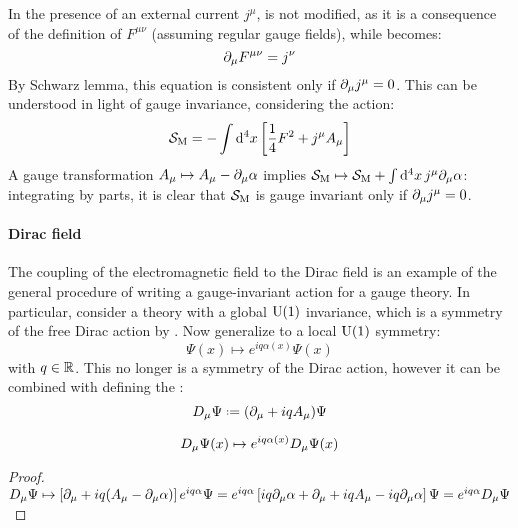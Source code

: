 In the presence of an external current $ j^\mu $,  is not modified, as it is a consequence of the definition of $ F^{\mu \nu} $ (assuming regular gauge fields), while  becomes:
\begin{equation}
  \partial_\mu F^{\mu \nu} = j^\nu
  \label{eq:maxw-3}
\end{equation}
By Schwarz lemma, this equation is consistent only if $ \partial_\mu j^\mu = 0 $. This can be understood in light of gauge invariance, considering the action:
\begin{equation}
  \mathcal{S}_\text{M} = - \int \mathrm{d}^4x \left[ \frac{1}{4} F^2 + j^\mu A_\mu \right]
\end{equation}
A gauge transformation $ A_\mu \mapsto A_\mu - \partial_\mu \alpha $ implies $ \mathcal{S}_\text{M} \mapsto \mathcal{S}_\text{M} + \int \mathrm{d}^4x\, j^\mu \partial_\mu \alpha $: integrating by parts, it is clear that $ \mathcal{S}_\text{M} $ is gauge invariant only if $ \partial_\mu j^\mu = 0 $.

\paragraph{Dirac field}

The coupling of the electromagnetic field to the Dirac field is an example of the general procedure of writing a gauge-invariant action for a gauge theory. In particular, consider a theory with a global $ \mathrm{U}(1) $ invariance, which is a symmetry of the free Dirac action by . Now generalize to a local $ \mathrm{U}(1) $ symmetry:
\begin{equation}
  \Psi(x) \mapsto e^{iq \alpha(x)} \Psi(x)
  \label{eq:qed-dir-inv}
\end{equation}
with $ q \in \mathbb{R} $. This no longer is a symmetry of the Dirac action, however it can be combined with  defining the :
\begin{equation}
  \covder_\mu \Psi \defeq (\pa_\mu + i q A_\mu) \Psi
\end{equation}

\begin{proposition}[before upper = {\tcbtitle}]{}{}
  \begin{equation}
    D_\mu \Psi(x) \mapsto e^{i q \alpha(x)} D_\mu \Psi(x)
    \label{eq:qed-cov-der}
  \end{equation}
\end{proposition}

\begin{proofbox}
  \begin{proof}
      $ D_\mu \Psi \mapsto \left[ \partial_\mu + i q (A_\mu - \partial_\mu \alpha) \right] e^{i q \alpha} \Psi = e^{i q \alpha} \left[ i q \partial_\mu \alpha + \partial_\mu + i q A_\mu - i q \partial_\mu \alpha \right] \Psi = e^{i q \alpha} D_\mu \Psi $
  \end{proof}
\end{proofbox}

